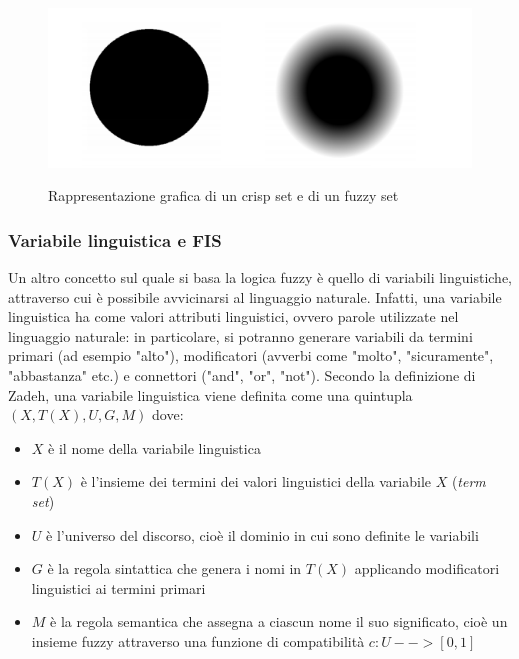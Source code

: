 \documentclass[11pt]{article}
\begin{document}
\begin{figure}[h!]
\begin{center}
  \includegraphics[width=13cm]{Immagini/fuzzyvscrisp.png}\\
  \caption{Rappresentazione grafica di un crisp set e di un fuzzy set}
\end{center}
\end{figure}




\subsubsection{Variabile linguistica e FIS}


Un altro concetto sul quale si basa la logica fuzzy è quello di variabili linguistiche, attraverso cui è possibile avvicinarsi al linguaggio naturale. Infatti, una variabile linguistica ha come valori attributi linguistici, ovvero parole utilizzate nel linguaggio naturale: in particolare, si potranno generare variabili da termini primari (ad esempio "alto"), modificatori (avverbi come "molto", "sicuramente", "abbastanza" etc.)  e connettori ("and", "or", "not"). Secondo la definizione di Zadeh, una variabile linguistica viene definita come una quintupla $(X, T(X), U, G, M)$ dove: 

\begin{itemize}
\item $X$ è il nome della variabile linguistica
\item $T(X)$ è l'insieme dei termini dei valori linguistici della variabile $X$ (\textit{term set}) 
\item $U$ è l'universo del discorso, cioè il dominio in cui sono definite le variabili
\item $G$ è la regola sintattica che genera i nomi in $T(X)$ applicando modificatori linguistici ai termini primari 
\item $M$ è la regola semantica che assegna a ciascun nome il suo significato, cioè un insieme fuzzy attraverso una funzione di compatibilità $c : U --> [0,1]$ 
\end{itemize}
\end{document}
